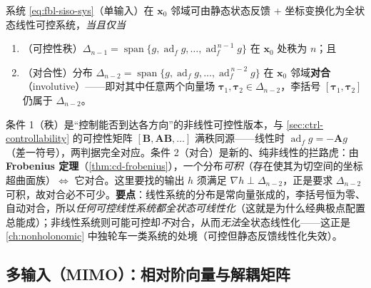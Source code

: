 \begin{theorem}[全状态反馈线性化的充要条件]
\label{thm:fbl-involutive}
系统 \cref{eq:fbl-siso-sys}（单输入）在 $\mathbf{x}_0$ 邻域可由静态状态反馈 + 坐标变换化为全状态线性可控系统，\emph{当且仅当}
\begin{enumerate}
  \item （可控性秩）$\Delta_{n-1}=\operatorname{span}\{g,\operatorname{ad}_f g,\dots,\operatorname{ad}_f^{\,n-1}g\}$ 在 $\mathbf{x}_0$ 处秩为 $n$；且
  \item （对合性）分布 $\Delta_{n-2}=\operatorname{span}\{g,\operatorname{ad}_f g,\dots,\operatorname{ad}_f^{\,n-2}g\}$ 在 $\mathbf{x}_0$ 邻域\textbf{对合}（involutive）——即对其中任意两个向量场 $\boldsymbol{\tau}_1,\boldsymbol{\tau}_2\in\Delta_{n-2}$，李括号 $[\boldsymbol{\tau}_1,\boldsymbol{\tau}_2]$ 仍属于 $\Delta_{n-2}$。
\end{enumerate}
\end{theorem}

\begin{insight}
条件 1（秩）是“控制能否到达各方向”的非线性可控性版本，与 \cref{sec:ctrl-controllability} 的可控性矩阵 $[\mathbf{B},\mathbf{A}\mathbf{B},\dots]$ 满秩同源——线性时 $\operatorname{ad}_f g=-\mathbf{A}g$（差一符号），两判据完全对应。条件 2（对合）是新的、纯非线性的拦路虎：由 \textbf{Frobenius 定理}（\cref{thm:cd-frobenius}），一个分布\emph{可积}（存在使其为切空间的坐标超曲面族）$\iff$ 它对合。这里要找的输出 $h$ 须满足 $\nabla h\perp\Delta_{n-2}$，正是要求 $\Delta_{n-2}$ 可积，故对合必不可少。\textbf{要点}：线性系统的分布是常向量张成的，李括号恒为零、自动对合，所以\emph{任何可控线性系统都全状态可线性化}（这就是为什么经典极点配置总能成）；非线性系统则可能可控却\emph{不}对合，从而\emph{无法}全状态线性化——这正是 \cref{ch:nonholonomic} 中独轮车一类系统的处境（可控但静态反馈线性化失效）。
\end{insight}

\subsection{多输入（MIMO）：相对阶向量与解耦矩阵}
\label{sec:fbl-mimo}

